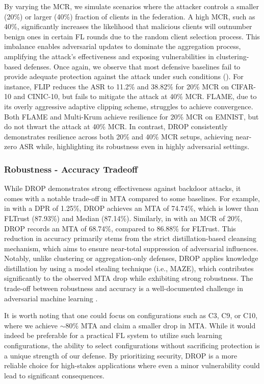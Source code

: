 By varying the MCR, we simulate scenarios where the attacker controls a smaller (20\%) or larger (40\%) fraction of clients in the federation. A high MCR, such as 40\%, significantly increases the likelihood that malicious clients will outnumber benign ones in certain FL rounds due to the random client selection process. This imbalance enables adversarial updates to dominate the aggregation process, amplifying the attack's effectiveness and exposing vulnerabilities in clustering-based defenses. Once again, we observe that most defensive baselines fail to provide adequate protection against the attack under such conditions (). For instance, FLIP reduces the ASR to 11.2\% and 38.82\% for 20\% MCR on CIFAR-10 and CINIC-10, but fails to mitigate the attack at 40\% MCR. FLAME, due to its overly aggressive adaptive clipping scheme, struggles to achieve convergence. Both FLAME and Multi-Krum achieve resilience for 20\% MCR on EMNIST, but do not thwart the attack at 40\% MCR. In contrast, DROP consistently demonstrates resilience across both 20\% and 40\% MCR setups, achieving near-zero ASR while, highlighting its robustness even in highly adversarial settings.

\subsubsection{Robustness - Accuracy Tradeoff} While DROP demonstrates strong effectiveness against backdoor attacks, it comes with a notable trade-off in MTA compared to some baselines. For example, in  with a DPR of 1.25\%, DROP achieves an MTA of 74.74\%, which is lower than FLTrust (87.93\%) and Median (87.14\%). Similarly, in  with an MCR of 20\%, DROP records an MTA of 68.74\%, compared to 86.88\% for FLTrust. This reduction in accuracy primarily stems from the strict distillation-based cleansing mechanism, which aims to ensure near-total suppression of adversarial influences. Notably, unlike clustering or aggregation-only defenses, DROP applies knowledge distillation by using a model stealing technique (i.e., MAZE), which contributes significantly to the observed MTA drop while exhibiting strong robustness. The trade-off between robustness and accuracy is a well-documented challenge in adversarial machine learning \citep{tsipras2019robustnessoddsaccuracy}.

It is worth noting that one could focus on configurations such as C3, C9, or C10, where we achieve $\sim 80\%$ MTA and claim a smaller drop in MTA. While it would indeed be preferable for a practical FL system to utilize such learning configurations, the ability to select configurations without sacrificing protection is a unique strength of our defense.  By prioritizing security, DROP is a more reliable choice for high-stakes applications where even a minor vulnerability could lead to significant consequences.

